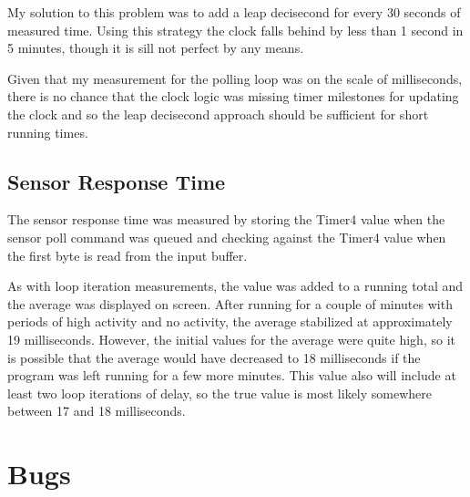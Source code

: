 \documentclass[pdftex,10pt,a4paper]{article}
\begin{document}
My solution to this problem was to add a leap decisecond for every 30
seconds of measured time. Using this strategy the clock falls behind
by less than 1 second in 5 minutes, though it is sill not perfect by
any means.

Given that my measurement for the polling loop was on the scale of
milliseconds, there is no chance that the clock logic was missing
timer milestones for updating the clock and so the leap decisecond
approach should be sufficient for short running times.

\subsection*{Sensor Response Time}

The sensor response time was measured by storing the Timer4 value when
the sensor poll command was queued and checking against the Timer4
value when the first byte is read from the input buffer.

As with loop iteration measurements, the value was added to a running
total and the average was displayed on screen. After running for a
couple of minutes with periods of high activity and no activity, the
average stabilized at approximately 19 milliseconds. However, the
initial values for the average were quite high, so it is possible that
the average would have decreased to 18 milliseconds if the program was
left running for a few more minutes. This value also will include at
least two loop iterations of delay, so the true value is most likely
somewhere between 17 and 18 milliseconds.

\newpage

\section*{Bugs}
\end{document}
